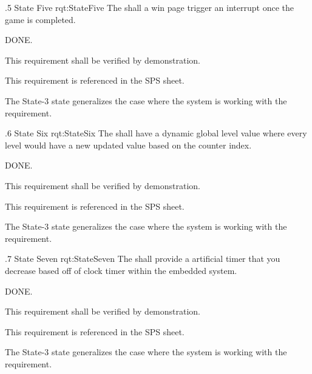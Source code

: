 \ONERQMTV
{\RqtNumberBase.5}
{State Five}
{rqt:StateFive}
{The \ThisSys shall a win page trigger an interrupt once the game is completed.}
{
	\item [Phase 1] DONE.

}
{This requirement shall be verified by demonstration.}
{
	\item [SPS] This requirement is referenced in the SPS sheet.
}
{
	\item The State-3 state generalizes the case where the system is working with the requirement.
}


\ONERQMTV
{\RqtNumberBase.6}
{State Six}
{rqt:StateSix}
{The \ThisSys shall have a dynamic global level value where every level would have a new updated value based on the counter index.}
{
	\item [Phase 1] DONE.
}
{This requirement shall be verified by demonstration.}
{
	\item [SPS] This requirement is referenced in the SPS sheet.
}
{
	\item The State-3 state generalizes the case where the system is working with the requirement.
}


\ONERQMTV
{\RqtNumberBase.7}
{State Seven}
{rqt:StateSeven}
{The \ThisSys shall provide a artificial timer that you decrease based off of clock timer within the embedded system.}
{
	\item [Phase 1] DONE.

}
{This requirement shall be verified by demonstration.}
{
	\item [SPS] This requirement is referenced in the SPS sheet.
}
{
	\item The State-3 state generalizes the case where the system is working with the requirement.
}


